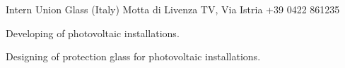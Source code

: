 \documentclass[english,a4paper]{europasscv}
\begin{document}
\begin{europasscv}
		 {
			Intern
		}
		\ecvitem{} {
			Union Glass (Italy) Motta di Livenza TV, Via Istria
			\newline +39 0422 861235
			\newline {}
		}
		\ecvitem{} {
			\begin{ecvitemize}
				\item Developing of photovoltaic installations.
				\item Designing of protection glass for photovoltaic
					installations.
			\end{ecvitemize}
		}



		\ecvlanguageheader
		\ecvlanguagefooter



	\end{europasscv}
\end{document}
